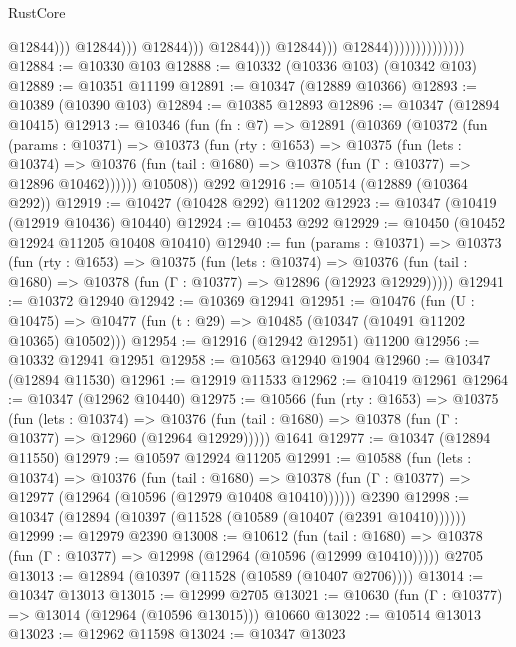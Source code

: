\begin{lexlean}{RustCore}
\begin{coremodule}
                                                              @12844)))
                                                        @12844)))
                                                  @12844)))
                                            @12844)))
                                      @12844)))
                                @12844))))))))))))))
@12884 := @10330 @103
@12888 := @10332 (@10336 @103) (@10342 @103)
@12889 := @10351 @11199
@12891 := @10347 (@12889 @10366)
@12893 := @10389 (@10390 @103)
@12894 := @10385 @12893
@12896 := @10347 (@12894 @10415)
@12913 := @10346
    (fun (fn : @7) =>
    @12891
      (@10369
        (@10372
          (fun (params : @10371) =>
          @10373
            (fun (rty : @1653) =>
            @10375
              (fun (lets : @10374) =>
              @10376 (fun (tail : @1680) => @10378 (fun (Γ : @10377) => @12896 @10462))))))
        @10508))
    @292
@12916 := @10514 (@12889 (@10364 @292))
@12919 := @10427 (@10428 @292) @11202
@12923 := @10347 (@10419 (@12919 @10436) @10440)
@12924 := @10453 @292
@12929 := @10450 (@10452 @12924 @11205 @10408 @10410)
@12940 := fun (params : @10371) =>
  @10373
    (fun (rty : @1653) =>
    @10375
      (fun (lets : @10374) =>
      @10376 (fun (tail : @1680) => @10378 (fun (Γ : @10377) => @12896 (@12923 @12929)))))
@12941 := @10372 @12940
@12942 := @10369 @12941
@12951 := @10476
    (fun (U : @10475) => @10477 (fun (t : @29) => @10485 (@10347 (@10491 @11202 @10365) @10502)))
@12954 := @12916 (@12942 @12951) @11200
@12956 := @10332 @12941 @12951
@12958 := @10563 @12940 @1904
@12960 := @10347 (@12894 @11530)
@12961 := @12919 @11533
@12962 := @10419 @12961
@12964 := @10347 (@12962 @10440)
@12975 := @10566
    (fun (rty : @1653) =>
    @10375
      (fun (lets : @10374) =>
      @10376 (fun (tail : @1680) => @10378 (fun (Γ : @10377) => @12960 (@12964 @12929)))))
    @1641
@12977 := @10347 (@12894 @11550)
@12979 := @10597 @12924 @11205
@12991 := @10588
    (fun (lets : @10374) =>
    @10376
      (fun (tail : @1680) =>
      @10378 (fun (Γ : @10377) => @12977 (@12964 (@10596 (@12979 @10408 @10410))))))
    @2390
@12998 := @10347 (@12894 (@10397 (@11528 (@10589 (@10407 (@2391 @10410))))))
@12999 := @12979 @2390
@13008 := @10612
    (fun (tail : @1680) => @10378 (fun (Γ : @10377) => @12998 (@12964 (@10596 (@12999 @10410)))))
    @2705
@13013 := @12894 (@10397 (@11528 (@10589 (@10407 @2706))))
@13014 := @10347 @13013
@13015 := @12999 @2705
@13021 := @10630 (fun (Γ : @10377) => @13014 (@12964 (@10596 @13015))) @10660
@13022 := @10514 @13013
@13023 := @12962 @11598
@13024 := @10347 @13023

\end{coremodule}
\end{lexlean}
